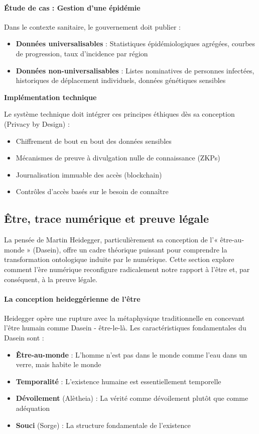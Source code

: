 \documentclass[12pt,a4paper]{article}
\begin{document}
\paragraph{Étude de cas : Gestion d'une épidémie}
Dans le contexte sanitaire, le gouvernement doit publier :
\begin{itemize}
\item \textbf{Données universalisables} : Statistiques épidémiologiques agrégées, courbes de progression, taux d'incidence par région
\item \textbf{Données non-universalisables} : Listes nominatives de personnes infectées, historiques de déplacement individuels, données génétiques sensibles
\end{itemize}

\textbf{Implémentation technique}

Le système technique doit intégrer ces principes éthiques dès sa conception (Privacy by Design) :
\begin{itemize}
\item Chiffrement de bout en bout des données sensibles
\item Mécanismes de preuve à divulgation nulle de connaissance (ZKPs)
\item Journalisation immuable des accès (blockchain)
\item Contrôles d'accès basés sur le besoin de connaître
\end{itemize}

\subsection{Être, trace numérique et preuve légale}



La pensée de Martin Heidegger, particulièrement sa conception de l'« être-au-monde » (Dasein), offre un cadre théorique puissant pour comprendre la transformation ontologique induite par le numérique. Cette section explore comment l'ère numérique reconfigure radicalement notre rapport à l'être et, par conséquent, à la preuve légale.

\paragraph{La conception heideggérienne de l'être}

Heidegger opère une rupture avec la métaphysique traditionnelle en concevant l'être humain comme Dasein - être-le-là. Les caractéristiques fondamentales du Dasein sont :
\begin{itemize}
\item \textbf{Être-au-monde} : L'homme n'est pas dans le monde comme l'eau dans un verre, mais habite le monde
\item \textbf{Temporalité} : L'existence humaine est essentiellement temporelle
\item \textbf{Dévoilement} (Alètheia) : La vérité comme dévoilement plutôt que comme adéquation
\item \textbf{Souci} (Sorge) : La structure fondamentale de l'existence
\end{itemize}
\end{document}

